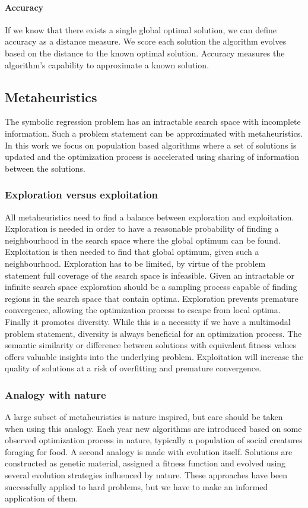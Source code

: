 \paragraph{Accuracy}
If we know that there exists a single global optimal solution, we can define accuracy as a distance measure. We score each solution the algorithm evolves based on the distance to the known optimal solution. Accuracy measures the algorithm's capability to approximate a known solution. 

\subsection{Metaheuristics}
The symbolic regression problem has an intractable search space with incomplete information. Such a problem statement can be approximated with metaheuristics. In this work we focus on population based algorithms where a set of solutions is updated and the optimization process is accelerated using sharing of information between the solutions.

\subsubsection{Exploration versus exploitation}
All metaheuristics need to find a balance between exploration and exploitation. Exploration is needed in order to have a reasonable probability of finding a neighbourhood in the search space where the global optimum can be found. Exploitation is then needed to find that global optimum, given such a neighbourhood. Exploration has to be limited, by virtue of the problem statement full coverage of the search space is infeasible. Given an intractable or infinite search space exploration should be a sampling process capable of finding regions in the search space that contain optima. Exploration prevents premature convergence, allowing the optimization process to escape from local optima. Finally it promotes diversity. While this is a necessity if we have a multimodal problem statement, diversity is always beneficial for an optimization process. The semantic similarity or difference between solutions with equivalent fitness values offers valuable insights into the underlying problem.
Exploitation will increase the quality of solutions at a risk of overfitting and premature convergence. 

\subsubsection{Analogy with nature}
A large subset of metaheuristics is nature inspired, but care should be taken when using this analogy. Each year new algorithms are introduced based on some observed optimization process in nature, typically a population of social creatures foraging for food. A second analogy is made with evolution itself. Solutions are constructed as genetic material, assigned a fitness function and evolved using several evolution strategies influenced by nature. These approaches have been successfully applied to hard problems, but we have to make an informed application of them.
